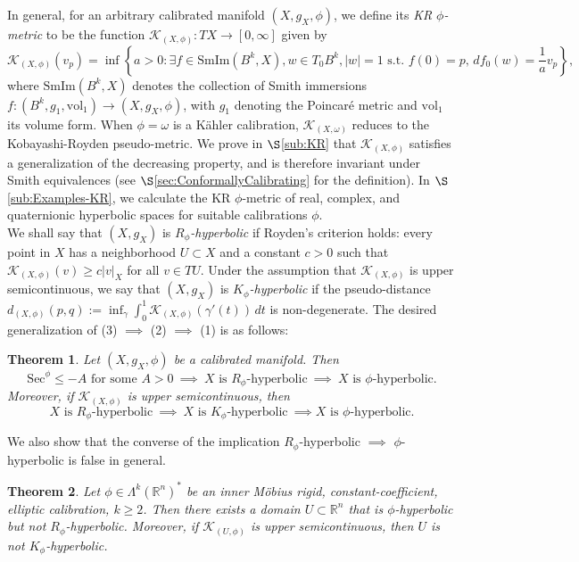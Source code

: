 \documentclass[11pt]{article}
\newcommand{\R}{\mathbb{R}}
\newcommand{\vol}{\mathrm{vol}}
\newtheorem{thm}{Theorem}[section]
\theoremstyle{definition}
\numberwithin{equation}{section}
\begin{document}
In general, for an arbitrary calibrated manifold $(X, g_X, \phi)$, we define its \emph{KR $\phi$-metric} to be the function $\mathcal{K}_{(X,\phi)} \colon TX \to [0,\infty]$ given by
$$\mathcal{K}_{(X, \phi)}(v_p) = \inf\!\left\{ a > 0 \colon \exists f \in \mathrm{SmIm}(B^k, X), w \in T_0B^k, |w| = 1 \text{ s.t. } f(0) = p,\, df_0(w) = \frac{1}{a}v_p \right\}\!,$$
where $\mathrm{SmIm}(B^k, X)$ denotes the collection of Smith immersions $f \colon (B^k, g_1, \vol_1) \to (X, g_X, \phi)$, with $g_1$ denoting the Poincar\'{e} metric and $\vol_1$ its volume form.  When $\phi = \omega$ is a K\"{a}hler calibration, $\mathcal{K}_{(X,\omega)}$ reduces to the Kobayashi-Royden pseudo-metric.  We prove in $\S$\ref{sub:KR} that $\mathcal{K}_{(X,\phi)}$ satisfies a generalization of the decreasing property, and is therefore invariant under Smith equivalences (see $\S$\ref{sec:ConformallyCalibrating} for the definition).  In $\S$\ref{sub:Examples-KR}, we calculate the KR $\phi$-metric of real, complex, and quaternionic hyperbolic spaces for suitable calibrations $\phi$. \\
\indent We shall say that $(X, g_X)$ is \emph{$R_\phi$-hyperbolic} if Royden's criterion holds: every point in $X$ has a neighborhood $U \subset X$ and a constant $c > 0$ such that $\mathcal{K}_{(X,\phi)}(v) \geq c|v|_X$ for all $v \in TU$.  Under the assumption that $\mathcal{K}_{(X,\phi)}$ is upper semicontinuous, we say that $(X,g_X)$ is \emph{$K_\phi$-hyperbolic} if the pseudo-distance $d_{(X,\phi)}(p,q) := \inf_\gamma \int_0^1 \mathcal{K}_{(X,\phi)}(\gamma'(t))\,dt$ is non-degenerate.  The desired generalization of (3) $\implies$ (2) $\implies$ (1) is as follows:

\begin{thm}  \label{thm:Main4} Let $(X, g_X, \phi)$ be a calibrated manifold.  Then
$$\mathrm{Sec}^\phi \leq -A \text{ for some } A > 0 \ \implies \ X \text{ is }R_\phi\text{-hyperbolic} \ \implies \ X \text{ is }\phi\text{-hyperbolic.}$$
Moreover, if $\mathcal{K}_{(X,\phi)}$ is upper semicontinuous, then
$$X\text{ is }R_\phi\text{-hyperbolic} \ \implies \ X \text{ is }K_\phi\text{-hyperbolic} \ \implies X \text{ is }\phi\text{-hyperbolic.}$$
\end{thm}

We also show that the converse of the implication $R_\phi$-hyperbolic $\implies$ $\phi$-hyperbolic is false in general.

\begin{thm} \label{thm:Main5} Let $\phi \in \Lambda^k(\R^n)^*$ be an inner M\"{o}bius rigid, constant-coefficient, elliptic calibration, $k \geq 2$.  Then there exists a domain $U \subset \R^n$ that is $\phi$-hyperbolic but not $R_\phi$-hyperbolic.  Moreover, if $\mathcal{K}_{(U,\phi)}$ is upper semicontinuous, then $U$ is not $K_\phi$-hyperbolic.
\end{thm}
\end{document}

